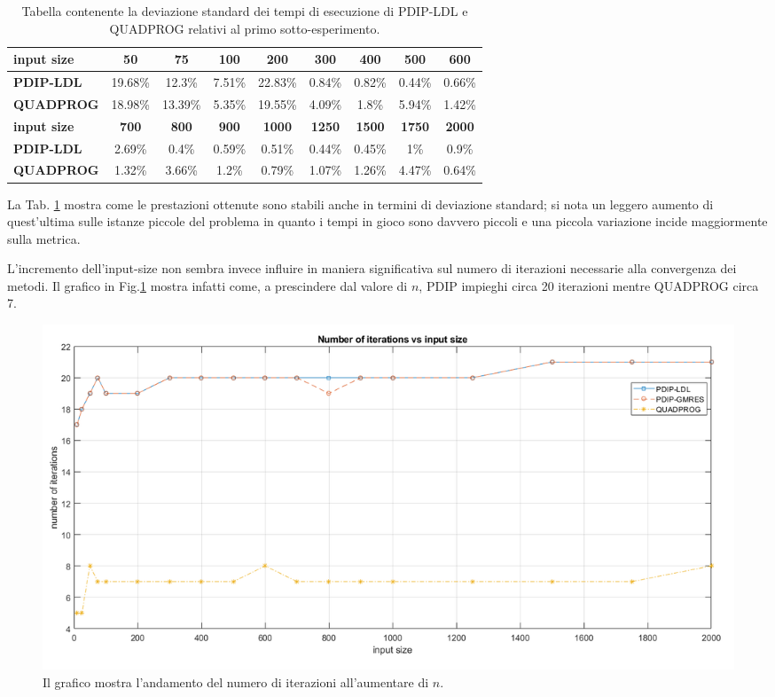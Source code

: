    
\begin{table}[!h]
\centering
\begin{tabular}{|l|c|c|c|c|c|c|c|c|}\hline
\textbf{input size} & \textbf{50}  & \textbf{75}  & \textbf{100} & \textbf{200}  & \textbf{300}  & \textbf{400}  & \textbf{500}  & \textbf{600}  \\\hline
\textbf{PDIP-LDL}   & 19.68\%      & 12.3\%      & 7.51\%      & 22.83\%        & 0.84\%        & 0.82\%        & 0.44\%        & 0.66\%        \\
\textbf{QUADPROG}   & 18.98\%      & 13.39\%      & 5.35\%      & 19.55\%        & 4.09\%        & 1.8\%        & 5.94\%       & 1.42\%        \\\hline
\textbf{input size} & \textbf{700} & \textbf{800} & \textbf{900} & \textbf{1000} & \textbf{1250} & \textbf{1500} & \textbf{1750} & \textbf{2000} \\\hline
\textbf{PDIP-LDL}   & 2.69\%       & 0.4\%       & 0.59\%       & 0.51\%        & 0.44\%        & 0.45\%        & 1\%        & 0.9\%        \\
\textbf{QUADPROG}   & 1.32\%       & 3.66\%       & 1.2\%       & 0.79\%        & 1.07\%        & 1.26\%        & 4.47\%        & 0.64\%     \\  \hline
\end{tabular}
    \caption{Tabella contenente la deviazione standard dei tempi di esecuzione di PDIP-LDL e QUADPROG relativi al primo sotto-esperimento. \label{tab:ldlqp1.1}}
\end{table}

\newpage La Tab. \ref{tab:ldlqp1.1} mostra come le prestazioni ottenute sono stabili anche in termini di deviazione standard; si nota un leggero aumento di quest'ultima sulle istanze piccole del problema in quanto i tempi in gioco sono davvero piccoli e una piccola variazione incide maggiormente sulla metrica.

L'incremento dell'input-size non sembra invece influire in maniera significativa sul  numero di iterazioni necessarie alla convergenza dei metodi.
Il grafico in Fig.\ref{fig:exp1.2} mostra infatti come, a prescindere dal valore di $n$, PDIP impieghi circa 20 iterazioni mentre QUADPROG circa 7.

\begin{figure}[!h]
    \centering
    \includegraphics[width=\textwidth]{img/MU7.png}
    \caption{Il grafico mostra l'andamento del numero di iterazioni all'aumentare di $n$. \label{fig:exp1.2}}
\end{figure}

